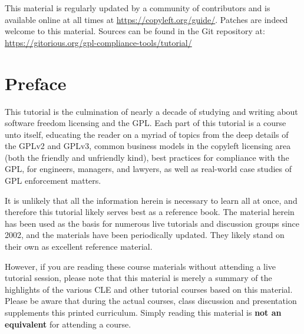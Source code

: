 \documentclass[10pt, letterpaper, openany, oneside]{book}
\begin{document}
\begin{titlepage}
\begin{center}
{\vfill

This material is regularly updated by a community of contributors and is
available online at all times at \url{https://copyleft.org/guide/}.  Patches
are indeed welcome to this material.  Sources can be found in the Git
repository at: \url{https://gitorious.org/gpl-compliance-tools/tutorial/}
}
\end{center}

\end{titlepage}

\tableofcontents

\chapter{Preface}

This tutorial is the culmination of nearly a decade of studying and writing
about software freedom licensing and the GPL\@.  Each part of this tutorial
is a course unto itself, educating the reader on a myriad of topics from the
deep details of the GPLv2 and GPLv3, common business models in the copyleft
licensing area (both the friendly and unfriendly kind), best practices for
compliance with the GPL, for engineers, managers, and lawyers, as well as
real-world case studies of GPL enforcement matters.

It is unlikely that all the information herein is necessary to learn all at
once, and therefore this tutorial likely serves best as a reference book.
The material herein has been used as the basis for numerous live tutorials
and discussion groups since 2002, and the materials have been periodically
updated.   They likely stand on their own as excellent reference material.

However, if you are reading these course materials without attending a live
tutorial session, please note that this material is merely a summary of the
highlights of the various CLE and other tutorial courses based on this
material.  Please be aware that during the actual courses, class discussion
and presentation supplements this printed curriculum.  Simply reading this
material is \textbf{not an equivalent} for attending a course.

\mainmatter







\appendix


\end{document}

